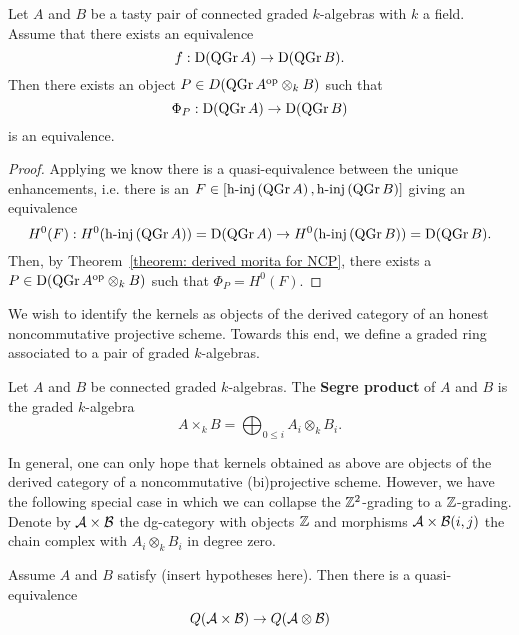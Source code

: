 \begin{corollary} \label{corollary: NCP morita}
  Let \(A\) and \(B\) be a tasty pair of connected graded \(k\)-algebras with \(k\) a field. Assume that there exists an equivalence
  \begin{displaymath}
    f : \mathrm{D} (\operatorname{QGr}A) \to \mathrm{D} (\operatorname{QGr}B).
  \end{displaymath}
  Then there exists an object \(P \in D ( \operatorname{QGr}A^{\operatorname{op}} \otimes_k B )\) such that 
  \begin{displaymath}
    \Phi_P : \mathrm{D} ( \operatorname{QGr}A) \to \mathrm{D} (\operatorname{QGr}B )
  \end{displaymath}
  is an equivalence.
\end{corollary}

\begin{proof}
  Applying \parencite[Theorem 1]{Lunts-Orlov} we know there is a quasi-equivalence between the unique enhancements, i.e. there is an \( F \in [ \operatorname{h-inj}\left( \operatorname{QGr}A\right), \operatorname{h-inj}\left( \operatorname{QGr}B\right) ]\) giving an equivalence
  \begin{displaymath}
    H^0(F) : H^0(\operatorname{h-inj}\left( \operatorname{QGr}A \right)) = \mathrm{D}(\operatorname{QGr}A) \to H^0(\operatorname{h-inj}\left( \operatorname{QGr}B \right)) = \mathrm{D}(\operatorname{QGr}B).
  \end{displaymath}
  Then, by Theorem~\ref{theorem: derived morita for NCP}, there exists a \(P \in \mathrm{D}(\operatorname{QGr}A^{\operatorname{op}} \otimes_k B)\) such that \(\Phi_P = H^0(F)\). 
\end{proof}

We wish to identify the kernels as objects of the derived category of an honest noncommutative projective scheme.  Towards this end, we define a graded ring associated to a pair of graded \(k\)-algebras.
\begin{definition}\label{def: segre product}
  Let \(A\) and \(B\) be connected graded \(k\)-algebras.
  The \textbf{Segre product} of \(A\) and \(B\) is the graded \(k\)-algebra
  \[ A \times_k B = \bigoplus_{0 \leq i} A_i \otimes_k B_i.\]
\end{definition}

In general, one can only hope that kernels obtained as above are objects of the derived category of a noncommutative (bi)projective scheme.
However, we have the following special case in which we can collapse the \(\mathbb{Z}^2\)-grading to a \(\mathbb{Z}\)-grading.
Denote by \(\mathcal{A} \times \mathcal{B}\) the dg-category with objects \(\mathbb{Z}\) and morphisms \(\mathcal{A} \times \mathcal{B}(i,j)\) the chain complex with \(A_i \otimes_k B_i\) in degree zero.

\begin{lemma}\label{lemma: Q(AxB) is Q(A tensor B)}
  Assume \(A\) and \(B\) satisfy (insert hypotheses here).
  Then there is a quasi-equivalence
  \[Q(\mathcal{A} \times \mathcal{B}) \to Q(\mathcal{A} \otimes \mathcal{B})\]
\end{lemma}


